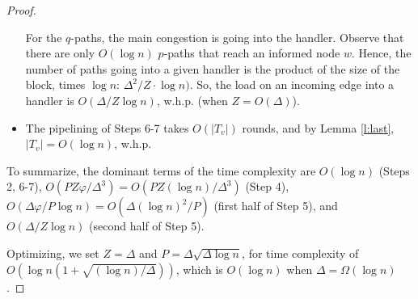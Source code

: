 \begin{proof}
\begin{itemize}
For the $q$-paths, the main congestion is going into the handler. Observe that there are only $O(\log n)$ $p$-paths that reach an informed node $w$. Hence, the number of paths going into a given handler is the product of the size of the block, times $\log n$: $\Delta^2/Z \cdot \log n)$. So, the load on an incoming edge into a handler is $O(\Delta/Z \log n)$, w.h.p. (when $Z = O(\Delta)$).

\item The pipelining of Steps 6-7 takes $O(|T_v|)$ rounds, and by Lemma \ref{l:last}, $|T_v| = O(\log n)$, w.h.p. 

\end{itemize}

To summarize, the dominant terms of the time complexity are $O(\log n)$ (Steps 2, 6-7), $O(PZ\varphi/\Delta^3) = O(PZ (\log n)/\Delta^3)$ (Step 4), $O(\Delta\varphi/P \log n) = O(\Delta(\log n)^2/P)$ (first half of Step 5), and $O(\Delta/Z \log n)$ (second half of Step 5).

Optimizing, we set $Z = \Delta$ and $P = \Delta \sqrt{\Delta\log n}$, 
for time complexity of $O(\log n (1 + \sqrt{(\log n)/\Delta}))$, which is $O(\log n)$ when $\Delta = \Omega(\log n)$. 
\end{proof}
